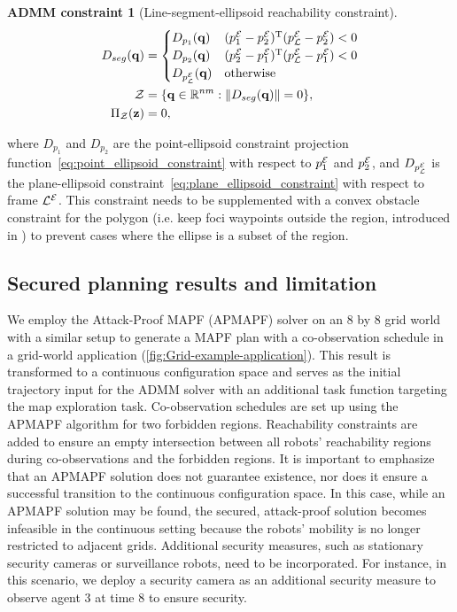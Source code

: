 \documentclass[10pt,twocolumn,twoside]{IEEEtran}
\newtheorem{constraint}{ADMM constraint}
\def\sZ{\mathcal{Z}}
\begin{document}
\begin{constraint}[Line-segment-ellipsoid reachability constraint]
\begin{align}
D_{seg}(\vq) &=  \begin{cases}
D_{p_{1}}(\vq) & (\Eframe{p_1}-\Eframe{p_2})\transpose (\Eframe{p_{\cL}}-\Eframe{p_2})<0\\
D_{p_{2}}(\vq) & (\Eframe{p_2}-\Eframe{p_1})\transpose (\Eframe{p_{\cL}} -\Eframe{p_1})<0\\
D_\Eframe{p_{\cL}}(\vq) & \textrm{otherwise}
\end{cases} \label{eq:segment_ellipsoid_constraint}\\
  \sZ &= \{\vq\in\mathbb{R}^{nm}:\norm{D_{seg}(\vq)} = 0 \},\\
   \Pi_\sZ(\vz) & = 0, 
\end{align}
\end{constraint}
where $D_{p_{1}}$ and $D_{p_{2}}$ are the point-ellipsoid constraint projection function~\eqref{eq:point_ellipsoid_constraint} with respect to ${p_{1}^{\mathcal{E}}}$ and ${p_{2}^{\mathcal{E}}}$, and $D_{p_{\mathcal{L}}^{\mathcal{E}}}$ is the plane-ellipsoid constraint~\eqref{eq:plane_ellipsoid_constraint} with respect to frame ${\mathcal{L}^{\mathcal{E}}}$.
This constraint needs to be supplemented with a convex obstacle constraint for the polygon (i.e. keep foci waypoints outside the region, introduced in \cite{yang2020multi}) to prevent cases where the ellipse is a subset of the region.

\subsection{Secured planning results and limitation}\label{sec:ADMM-simulation}

We employ the Attack-Proof MAPF (APMAPF) solver \cite{wardega2019resilience} on an 8 by 8 grid world with a similar setup to generate a MAPF plan with a co-observation schedule in a grid-world application (\cref{fig:Grid-example-application}). This result is transformed to a continuous configuration space and serves as the initial trajectory input for the ADMM solver with an additional task function targeting the map exploration task. Co-observation schedules are set up using the APMAPF algorithm for two forbidden regions. Reachability constraints are added to ensure an empty intersection between all robots' reachability regions during co-observations and the forbidden regions. It is important to emphasize that an APMAPF solution does not guarantee existence, nor does it ensure a successful transition to the continuous configuration space. In this case, while an APMAPF solution may be found, the secured, attack-proof solution becomes infeasible in the continuous setting because the robots' mobility is no longer restricted to adjacent grids. Additional security measures, such as stationary security cameras or surveillance robots, need to be incorporated. For instance, in this scenario, we deploy a security camera as an additional security measure to observe agent 3 at time $8$ to ensure security.
\end{document}
